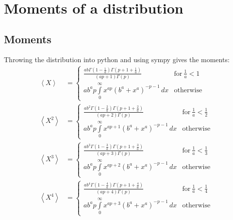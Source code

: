 \clearpage
\section{Moments of a distribution}
\subsection{Moments}
Throwing the distribution into python and using sympy gives the moments:
\begin{align}
    \left<X\right> &= \begin{cases} \frac{a b \Gamma\left(1 - \frac{1}{a}\right) \Gamma\left(p + 1 + \frac{1}{a}\right)}{\left(a p + 1\right) \Gamma\left(p\right)} & \text{for}\: \frac{1}{a} < 1 \\a b^{a} p \int\limits_{0}^{\infty} x^{a p} \left(b^{a} + x^{a}\right)^{- p - 1}\, dx & \text{otherwise} \end{cases}\\
    \left<X^2\right> &= \begin{cases} \frac{a b^{2} \Gamma\left(1 - \frac{2}{a}\right) \Gamma\left(p + 1 + \frac{2}{a}\right)}{\left(a p + 2\right) \Gamma\left(p\right)} & \text{for}\: \frac{1}{a} < \frac{1}{2} \\a b^{a} p \int\limits_{0}^{\infty} x^{a p + 1} \left(b^{a} + x^{a}\right)^{- p - 1}\, dx & \text{otherwise} \end{cases}\\
    \left<X^3\right> &= \begin{cases} \frac{a b^{3} \Gamma\left(1 - \frac{3}{a}\right) \Gamma\left(p + 1 + \frac{3}{a}\right)}{\left(a p + 3\right) \Gamma\left(p\right)} & \text{for}\: \frac{1}{a} < \frac{1}{3} \\a b^{a} p \int\limits_{0}^{\infty} x^{a p + 2} \left(b^{a} + x^{a}\right)^{- p - 1}\, dx & \text{otherwise} \end{cases}\\
    \left<X^4\right> &= \begin{cases} \frac{a b^{4} \Gamma\left(1 - \frac{4}{a}\right) \Gamma\left(p + 1 + \frac{4}{a}\right)}{\left(a p + 4\right) \Gamma\left(p\right)} & \text{for}\: \frac{1}{a} < \frac{1}{4} \\a b^{a} p \int\limits_{0}^{\infty} x^{a p + 3} \left(b^{a} + x^{a}\right)^{- p - 1}\, dx & \text{otherwise} \end{cases}
\end{align}
